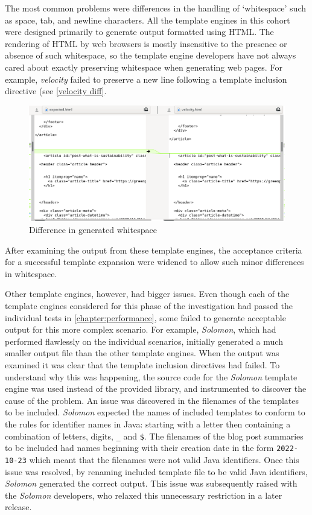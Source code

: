 The most common problems were differences in the handling of `whitespace' such as space, tab, and newline characters. All the template engines in this cohort were designed primarily to generate output formatted using HTML. The rendering of HTML by web browsers is mostly insensitive to the presence or absence of such whitespace, so the template engine developers have not always cared about exactly preserving whitespace when generating web pages. For example, \emph{velocity} failed to preserve a new line following a template inclusion directive (see \autoref{velocity diff}.

\begin{figure}[htbp]
  \centering
  \includegraphics[width=\columnwidth]{Figures/graphs/Page/velocity-diff.png}
  \caption{Difference in generated whitespace}
  \label{velocity diff}
\end{figure}

After examining the output from these template engines, the acceptance criteria for a successful template expansion were widened to allow such minor differences in whitespace.

Other template engines, however, had bigger issues. Even though each of the template engines considered for this phase of the investigation had passed the individual tests in \autoref{chapter:performance}, some failed to generate acceptable output for this more complex scenario. For example, \emph{Solomon}, which had performed flawlessly on the individual scenarios, initially generated a much smaller output file than the other template engines. When the output was examined it was clear that the template inclusion directives had failed. To understand why this was happening, the source code for the \emph{Solomon} template engine was used instead of the provided library, and instrumented to discover the cause of the problem. An issue was discovered in the filenames of the templates to be included. \emph{Solomon} expected the names of included templates to conform to the rules for identifier names in Java: starting with a letter then containing a combination of letters, digits, \verb!_! and \verb!$!. The filenames of the blog post summaries to be included had names beginning with their creation date in the form \verb!2022-10-23! which meant that the filenames were not valid Java identifiers. Once this issue was resolved, by renaming included template file to be valid Java identifiers, \emph{Solomon} generated the correct output. This issue was subsequently raised with the \emph{Solomon} developers, who relaxed this unnecessary restriction in a later release.

